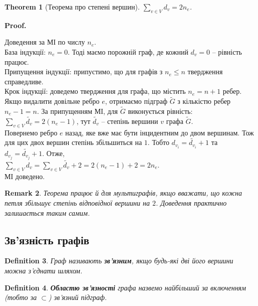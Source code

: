 \documentclass[a4paper, 14pt]{extarticle}
\makeatletter
\theoremstyle{theoremdd}
\newtheorem{theorem}{Theorem}[subsection]
\theoremstyle{theoremdd}
\newtheorem{definition}[theorem]{Definition}
\theoremstyle{theoremdd}
\theoremstyle{theoremdd}
\theoremstyle{theoremdd}
\theoremstyle{theoremdd}
\theoremstyle{theoremdd}
\theoremstyle{theoremdd}
\theoremstyle{theoremdd}
\theoremstyle{theoremdd}
\theoremstyle{theoremdd}
\newtheorem{remark}[theorem]{Remark}
\theoremstyle{theoremdd}
\theoremstyle{theoremdd}
\theoremstyle{theoremdd}
\theoremstyle{theoremdd}
\renewenvironment{proof}[1][Proof.\\]{\par
\pushQED{\hfill \qed}%
\normalfont \topsep6\p@\@plus6\p@\relax
\trivlist
\item\relax
{\bfseries
#1\@addpunct{.}}\hspace\labelsep\ignorespaces
}{%
\popQED\endtrivlist\@endpefalse
}
\makeatother
\begin{document}
\begin{theorem}[Теорема про степені вершин]
$\displaystyle\sum_{v \in V} d_v = 2n_e$.
\end{theorem}

\begin{proof}
Доведення за МІ по числу $n_e$.\\
База індукції: $n_e = 0$. Тоді маємо порожній граф, де кожний $d_v = 0$ -- рівність працює.\\
Припущення індукції: припустимо, що для графів з $n_e \leq n$ твердження справедливе.\\
Крок індукції: доведемо твердження для графа, що містить $n_e = n+1$ ребер. Якщо видалити довільне ребро $e$, отримаємо підграф $\tilde{G}$ з кількістю ребер $n_e-1=n$. За припущенням МІ, для $\tilde{G}$ виконується рівність:\\
$\displaystyle\sum_{v \in V} \tilde{d_v} = 2(n_e-1)$, тут $\tilde{d_v}$ -- степінь вершини $v$ графа $\tilde{G}$.\\
Повернемо ребро $e$ назад, яке вже має бути інцидентним до двом вершинам. Тож для цих двох вершин степінь збільшиться на $1$. Тобто $d_{v_i} = \tilde{d_{v_i}} + 1$ та $d_{v_j} = \tilde{d_{v_j}} + 1$. Отже,\\
$\displaystyle\sum_{v \in V} d_v = \sum_{v \in V} \tilde{d_v} + 2 = 2(n_e-1) + 2 = 2n_e$.\\
МІ доведено.
\end{proof}

\begin{remark}
Теорема працює й для мультиграфів, якщо вважати, що кожна петля збільшує степінь відповідної вершини на $2$. Доведення практично залишається таким самим.
\end{remark}

\subsection{Зв'язність графів}
\begin{definition}
Граф називають \textbf{зв'язним}, якщо будь-які дві його вершини можна з'єднати шляхом.
\end{definition}

\begin{definition}
\textbf{Областю зв'язності} графа назвемо найбільший за включенням (тобто за $\subset$) зв'язний підграф.
\end{definition}
\end{document}
